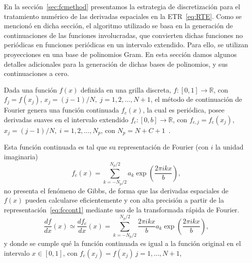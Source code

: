 En la sección~\ref{sec:fcmethod} presentamos la estrategia de discretización 
para el tratamiento numérico de las derivadas espaciales en la ETR~\eqref{eq:RTE}. 
Como se mencionó en dicha sección, el algoritmo utilizado se basa 
en la generación de continuaciones de las funciones involucradas, 
que convierten dichas funciones no periódicas en funciones periódicas 
en un intervalo extendido. Para ello, se utilizan proyecciones en una base 
de polinomios Gram. En esta sección damos algunos detalles 
adicionales para la generación de dichas bases de polinomios, y sus continuaciones a cero.

Dada una función $f(x)$ definida en una grilla discreta, $f:[0,1]\rightarrow \mathbb{R}$, 
con $f_j=f(x_j)$, $x_j=(j-1)/N,\;j=1,2,\ldots,N+1$, el método de continuación de 
Fourier genera una función continuada $f_c(x)$, la cual es periódica, posee 
derivadas suaves en el intervalo extendido $f_c: [0,b] \rightarrow \mathbb{R}$, con $f_{c,j}=f_c(x_j)$, $x_j=(j-1)/N,\;i=1,2,\ldots,N_p$, con 
$N_p=N+C+1$~\cite{Albin2011,Amlani2016}.

Esta función continuada es tal que su representación de Fourier (con $i$ la unidad imaginaria)
\begin{equation}
f_c(x)=\sum_{k=-N_p/2}^{N_p/2} a_k \exp\left( \frac{2\pi i k x}{b} \right),
\label{eq:fccont1}
\end{equation}
no presenta el fenómeno de Gibbs, de forma que las derivadas espaciales de $f(x)$ 
pueden calcularse eficientemente y con alta precisión a partir de la representación~\eqref{eq:fccont1} mediante uso de la transformada rápida de Fourier.
\begin{equation}
\frac{df}{dx}(x)\simeq \frac{df_c}{dx}(x)=\sum_{k=-N_p/2}^{N_p/2} \frac{2\pi i k x}{b} a_k \exp\left( \frac{2\pi i k x}{b} \right),
\label{eq:fccont2}
\end{equation}
y donde se cumple qué la función continuada es igual a la función original en el intervalo $x\in[0,1]$, con $f_c(x_j)=f(x_j)\,j=1,\ldots,N+1$,

